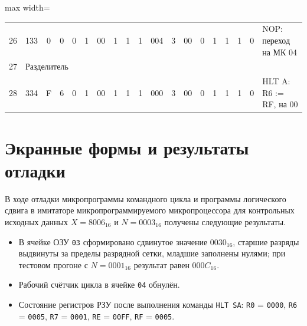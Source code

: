 \documentclass[11pt, a4paper]{article}
\begin{document}
{\begin{table}[h!]
\begin{adjustbox}{max width=\textwidth}
\begin{tabular}{|c|c|c|c|c|c|c|c|c|c|c|c|c|c|c|c|c|c|l|}
				26          & 133                               & 0                                 & 0                                      & 0                                      & 1             & 00          & 1                                       & 1                                     & 1                    & 004            & 3             & 00         & 0          & 1            & 1           & 1            & 0           & NOP: переход на МК 04          \\
				27          & \multicolumn{18}{l|}{Разделитель}                                                                                                                                                                                                                                                                                                                                                                                                                    \\
				28          & 334                               & F                                 & 6                                      & 0                                      & 1             & 00          & 1                                       & 1                                     & 1                    & 000            & 3             & 00         & 0          & 1            & 1           & 1            & 0           & HLT A: R6 := RF, на 00         \\
				\hline
			\end{tabular}
		\end{adjustbox}
		\end{table}
	}

\section{Экранные формы и результаты отладки}
В ходе отладки микропрограммы командного цикла и программы логического сдвига в имитаторе микропрограммируемого микропроцессора для контрольных исходных данных $X = 8006_{16}$ и $N = 0003_{16}$ получены следующие результаты.
\begin{itemize}
	\item В ячейке ОЗУ \texttt{03} сформировано сдвинутое значение $0030_{16}$, старшие разряды выдвинуты за пределы разрядной сетки, младшие заполнены нулями; при тестовом прогоне с $N = 0001_{16}$ результат равен $000C_{16}$.
	\item Рабочий счётчик цикла в ячейке \texttt{04} обнулён.
	\item Состояние регистров РЗУ после выполнения команды \texttt{HLT SA}: \texttt{R0} = \texttt{0000}, \texttt{R6} = \texttt{0005}, \texttt{R7} = \texttt{0001}, \texttt{RE} = \texttt{00FF}, \texttt{RF} = \texttt{0005}.
\end{itemize}
\end{document}
